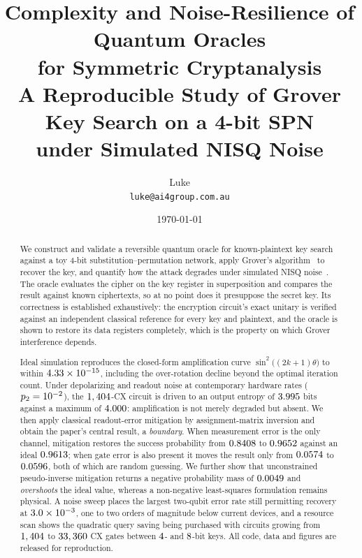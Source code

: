 \documentclass[11pt,a4paper]{article}
\title{\bfseries Complexity and Noise-Resilience of Quantum Oracles\\
       for Symmetric Cryptanalysis\\[0.4em]
       \large A Reproducible Study of Grover Key Search on a 4-bit SPN\\
       under Simulated NISQ Noise}
\author{Luke\\ \small\texttt{luke@ai4group.com.au}}
\date{\today}
\begin{document}
\maketitle

\begin{abstract}
\noindent
We construct and validate a reversible quantum oracle for known-plaintext key
search against a toy 4-bit substitution--permutation network, apply Grover's
algorithm~\citep{grover1996} to recover the key, and quantify how the attack
degrades under simulated NISQ noise~\citep{preskill2018}. The oracle evaluates
the cipher on the key register in superposition and compares the result against
known ciphertexts, so at no point does it presuppose the secret key. Its
correctness is established exhaustively: the encryption circuit's exact unitary
is verified against an independent classical reference for every key and
plaintext, and the oracle is shown to restore its data registers completely,
which is the property on which Grover interference depends.

Ideal simulation reproduces the closed-form amplification curve
$\sin^2\!\big((2k{+}1)\theta\big)$ to within $4.33\times10^{-15}$, including the
over-rotation decline beyond the optimal iteration count. Under depolarizing
and readout noise at contemporary hardware rates ($p_2 = 10^{-2}$), the
$1,404$-CX circuit is driven to an output entropy of $3.995$ bits against a
maximum of $4.000$: amplification is not merely degraded but absent. We
then apply classical readout-error mitigation by assignment-matrix inversion
and obtain the paper's central result, a \emph{boundary}. When measurement
error is the only channel, mitigation restores the success probability from
$0.8408$ to $0.9652$ against an ideal $0.9613$; when gate error
is also present it moves the result only from $0.0574$ to $0.0596$,
both of which are random guessing. We further show that unconstrained
pseudo-inverse mitigation returns a negative probability mass of
$0.0049$ and \emph{overshoots} the ideal value, whereas a
non-negative least-squares formulation remains physical. A noise sweep places
the largest two-qubit error rate still permitting recovery at
$3.0\times10^{-3}$, one to two orders of magnitude below current devices, and a
resource scan shows the quadratic query saving being purchased with circuits
growing from $1,404$ to $33,360$ CX gates between $4$- and
$8$-bit keys. All code, data and figures are released for
reproduction.
\end{abstract}
\end{document}
